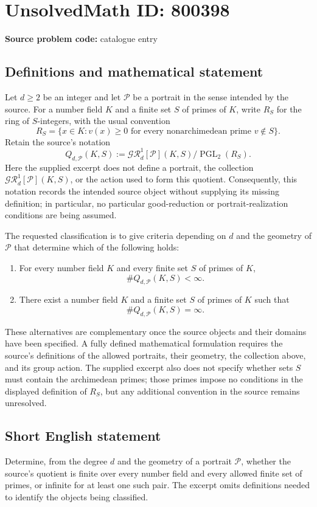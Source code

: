 \documentclass[11pt]{article}
\begin{document}
\section*{UnsolvedMath ID: 800398}
\textbf{Source problem code:} catalogue entry
\subsection{Definitions and mathematical statement}
Let \(d\geq 2\) be an integer and let \(\mathcal P\) be a portrait in the sense intended by the source. For a number field \(K\) and a finite set \(S\) of primes of \(K\), write \(R_S\) for the ring of \(S\)-integers, with the usual convention
\[
R_S=\{x\in K: v(x)\geq 0\text{ for every nonarchimedean prime }v\notin S\}.
\]
Retain the source's notation
\[
Q_{d,\mathcal P}(K,S):=
\mathcal{G\!R}_d^1[\mathcal P](K,S)/\operatorname{PGL}_2(R_S).
\]
Here the supplied excerpt does not define a portrait, the collection \(\mathcal{G\!R}_d^1[\mathcal P](K,S)\), or the action used to form this quotient. Consequently, this notation records the intended source object without supplying its missing definition; in particular, no particular good-reduction or portrait-realization conditions are being assumed.

The requested classification is to give criteria depending on \(d\) and the geometry of \(\mathcal P\) that determine which of the following holds:
\begin{enumerate}
\item For every number field \(K\) and every finite set \(S\) of primes of \(K\),
\[
\#Q_{d,\mathcal P}(K,S)<\infty.
\]
\item There exist a number field \(K\) and a finite set \(S\) of primes of \(K\) such that
\[
\#Q_{d,\mathcal P}(K,S)=\infty.
\]
\end{enumerate}
These alternatives are complementary once the source objects and their domains have been specified. A fully defined mathematical formulation requires the source's definitions of the allowed portraits, their geometry, the collection above, and its group action. The supplied excerpt also does not specify whether sets \(S\) must contain the archimedean primes; those primes impose no conditions in the displayed definition of \(R_S\), but any additional convention in the source remains unresolved.
\subsection{Short English statement}
Determine, from the degree \(d\) and the geometry of a portrait \(\mathcal P\), whether the source's quotient is finite over every number field and every allowed finite set of primes, or infinite for at least one such pair. The excerpt omits definitions needed to identify the objects being classified.
\end{document}

